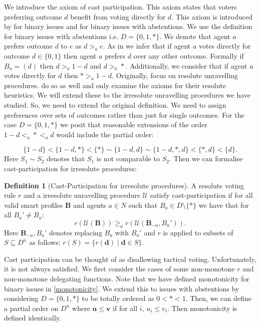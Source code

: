 \documentclass[11pt,a4paper, titlepage]{article}
\theoremstyle{definition}
\newtheorem{definition}[theorem]{Definition}
\let\vec\mathbf
\begin{document}
We introduce the axiom of cast participation. This axiom states that voters preferring outcome $d$ benefit from voting directly for $d$. 
This axiom is introduced by \cite{kotsialou} for binary issues and \cite{grandi} for binary issues with abstentions. 
We use the definition for binary issues with abstentions i.e. $D = \{0, 1, *\}$.
We denote that agent $a$ prefers outcome $d$ to $e$ as $d >_a e$. As in \citeauthor{grandi} we infer that if agent $a$ votes directly for outcome $d \in \{0, 1\}$ then agent $a$ prefers $d$ over any other outcome. 
Formally if $B_a = (d)$ then $ d >_a 1-d$ and $d >_a *$.
Additionally, we consider that if agent $a$ votes directly for $d$ then $* >_a 1-d$. 
Originally, \citeauthor{kotsialou} focus on resolute unravelling procedures. \citeauthor{grandi} do so as well and only examine the axioms for their resolute heuristics.
We will extend these to the irresolute unravelling procedures we have studied.
So, we need to extend the original definition. 
We need to assign preferences over sets of outcomes rather than just for single outcomes.
For the case $D = \{0, 1, *\}$ we posit that reasonable extensions of the order $1-d <_a * <_a d$ would include the partial order:

\[
    \{1-d\} < \{1-d, *\} < \{*\} \sim \{1-d, d\} \sim \{1-d, *, d\} < \{*, d \}< \{d\}.
\]
Here $S_1 \sim S_2$ denotes that $S_1$ is not comparable to $S_2$.
Then we can formalise cast-participation for irresolute procedures:

\begin{definition}[Cast-Participation for irresolute procedures]
    A resolute voting rule $r$ and a irresolute unravelling procedure $\mathcal{U}$ satisfy cast-participation if for all valid smart profiles $\mathbf{B}$ and agents $a \in N$ such that $B_a \in D \setminus \{*\}$ we have that for all $B_a' \neq B_a$:
    \[
        r(\mathcal{U}(\mathbf{B})) \geq_a r(\mathcal{U}(\mathbf{B}_{-a}, B_a')).
    \]
    Here $\mathbf{B}_{-a}, B_a'$ denotes replacing $B_a$ with $B_a'$ and $r$ is applied to subsets of $S \subseteq D^n$ as follows: $r(S) = \{r(\vec{d}) \mid \vec{d} \in S\}$.
\end{definition}

Cast participation can be thought of as disallowing tactical voting. Unfortunately, it is not always satisfied. 
We first consider the cases of some non-monotone $r$ and non-monotone delegating functions. 
Note that we have defined monotonicity for binary issues in \cref{monotonicity}. 
We extend this to issues with abstentions by considering $D = \{0, 1, *\}$ to be totally ordered as $0 < * < 1$.
Then, we can define a partial order on $D^n$ where $\vec{u} \leq \vec{v}$ if for all $i$, $u_i \leq v_i$. Then monotonicity is defined identically.
\end{document}

